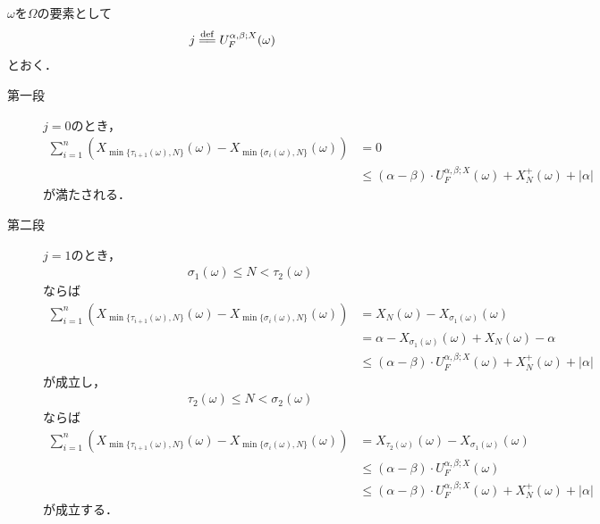  	$\omega$を$\Omega$の要素として
 	\begin{align}
 		j \defeq U_F^{\alpha,\beta;X}(\omega)
 	\end{align}
 	とおく．
 	\begin{description}
 		\item[第一段]
 			$j = 0$のとき，
 			\begin{align}
 				\sum_{i=1}^n \left( X_{\min{}{\{\tau_{i+1}(\omega),N\}}}(\omega) - X_{\min{}{\{\sigma_i(\omega),N\}}}(\omega) \right)
 				&= 0 \\
 				&\leq (\alpha - \beta) \cdot U_F^{\alpha,\beta;X}(\omega) + X_N^+(\omega) + |\alpha|
 			\end{align}
 			が満たされる．
 		
 		\item[第二段]
 			$j = 1$のとき，
 			\begin{align}
 				\sigma_1(\omega) \leq N < \tau_2(\omega)
 			\end{align}
 			ならば
 			\begin{align}
 				\sum_{i=1}^n \left( X_{\min{}{\{\tau_{i+1}(\omega),N\}}}(\omega) - X_{\min{}{\{\sigma_i(\omega),N\}}}(\omega) \right)
 				&= X_N(\omega) - X_{\sigma_1(\omega)}(\omega) \\
 				&= \alpha - X_{\sigma_1(\omega)}(\omega) + X_N(\omega) - \alpha \\
 				&\leq (\alpha - \beta) \cdot U_F^{\alpha,\beta;X}(\omega) + X_N^+(\omega) + |\alpha|
 			\end{align}
 			が成立し，
 			\begin{align}
 				\tau_2(\omega) \leq N < \sigma_2(\omega)
 			\end{align}
 			ならば
 			\begin{align}
 				\sum_{i=1}^n \left( X_{\min{}{\{\tau_{i+1}(\omega),N\}}}(\omega) - X_{\min{}{\{\sigma_i(\omega),N\}}}(\omega) \right)
 				&= X_{\tau_2(\omega)}(\omega) - X_{\sigma_1(\omega)}(\omega) \\
 				&\leq (\alpha - \beta) \cdot U_F^{\alpha,\beta;X}(\omega) \\
 				&\leq (\alpha - \beta) \cdot U_F^{\alpha,\beta;X}(\omega) + X_N^+(\omega) + |\alpha|
 			\end{align}
 			が成立する．
 		

\end{description}
